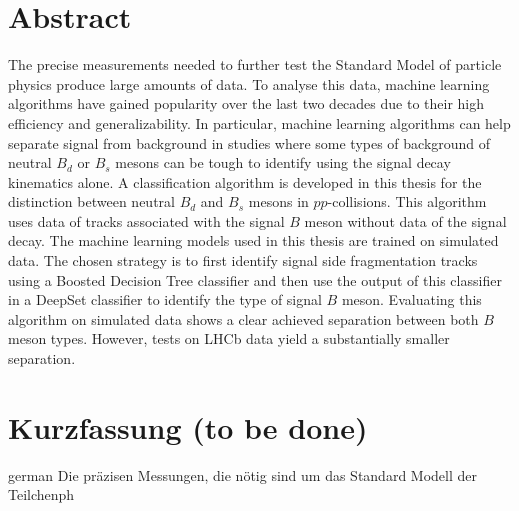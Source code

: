 \thispagestyle{plain}

\section*{Abstract}
The precise measurements needed to further test the Standard Model of particle physics produce large amounts of data.
To analyse this data, machine learning algorithms have gained popularity over the last two decades due to their high efficiency and generalizability.
In particular, machine learning algorithms can help separate signal from background in studies where some types of background of neutral $B_d$ or $B_s$ mesons can be tough to identify using the signal decay kinematics alone.
A classification algorithm is developed in this thesis for the distinction between neutral $B_d$ and $B_s$ mesons in $pp$-collisions.
This algorithm uses data of tracks associated with the signal $B$ meson without data of the signal decay. 
The machine learning models used in this thesis are trained on simulated data. 
The chosen strategy is to first identify signal side fragmentation tracks using a Boosted Decision Tree classifier and then use the output of this classifier in a DeepSet classifier to identify the type of signal $B$ meson.
Evaluating this algorithm on simulated data shows a clear achieved separation between both $B$ meson types.
However, tests on LHCb data yield a substantially smaller separation.

\section*{Kurzfassung (to be done)} %
\begin{foreignlanguage}{german}
    Die präzisen Messungen, die nötig sind um das Standard Modell der Teilchenph
\end{foreignlanguage}
